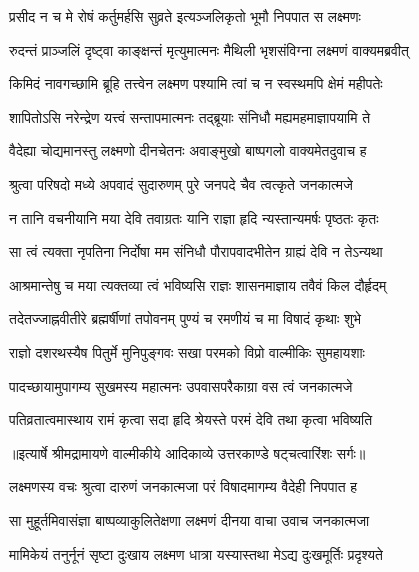 \twolineshloka
{प्रसीद न च मे रोषं कर्तुमर्हसि सुव्रते}
{इत्यञ्जलिकृतो भूमौ निपपात स लक्ष्मणः} %

\twolineshloka
{रुदन्तं प्राञ्जलिं दृष्ट्वा काङ्क्षन्तं मृत्युमात्मनः}
{मैथिली भृशसंविग्ना लक्ष्मणं वाक्यमब्रवीत्} %

\twolineshloka
{किमिदं नावगच्छामि ब्रूहि तत्त्वेन लक्ष्मण}
{पश्यामि त्वां च न स्वस्थमपि क्षेमं महीपतेः} %

\twolineshloka
{शापितोऽसि नरेन्द्रेण यत्त्वं सन्तापमात्मनः}
{तद्ब्रूयाः संनिधौ मह्यमहमाज्ञापयामि ते} %

\twolineshloka
{वैदेह्या चोद्यमानस्तु लक्ष्मणो दीनचेतनः}
{अवाङ्मुखो बाष्पगलो वाक्यमेतदुवाच ह} %

\twolineshloka
{श्रुत्वा परिषदो मध्ये अपवादं सुदारुणम्}
{पुरे जनपदे चैव त्वत्कृते जनकात्मजे} %

\twolineshloka
{न तानि वचनीयानि मया देवि तवाग्रतः}
{यानि राज्ञा हृदि न्यस्तान्यमर्षः पृष्ठतः कृतः} %

\twolineshloka
{सा त्वं त्यक्ता नृपतिना निर्दोषा मम संनिधौ}
{पौरापवादभीतेन ग्राह्यं देवि न तेऽन्यथा} %

\twolineshloka
{आश्रमान्तेषु च मया त्यक्तव्या त्वं भविष्यसि}
{राज्ञः शासनमाज्ञाय तवैवं किल दौर्हृदम्} %

\twolineshloka
{तदेतज्जाह्नवीतीरे ब्रह्मर्षीणां तपोवनम्}
{पुण्यं च रमणीयं च मा विषादं कृथाः शुभे} %

\twolineshloka
{राज्ञो दशरथस्यैष पितुर्मे मुनिपुङ्गवः}
{सखा परमको विप्रो वाल्मीकिः सुमहायशाः} %

\twolineshloka
{पादच्छायामुपागम्य सुखमस्य महात्मनः}
{उपवासपरैकाग्रा वस त्वं जनकात्मजे} %

\twolineshloka
{पतिव्रतात्वमास्थाय रामं कृत्वा सदा हृदि}
{श्रेयस्ते परमं देवि तथा कृत्वा भविष्यति} %


{॥इत्यार्षे श्रीमद्रामायणे वाल्मीकीये आदिकाव्ये उत्तरकाण्डे षट्चत्वारिंशः सर्गः॥}


\twolineshloka
{लक्ष्मणस्य वचः श्रुत्वा दारुणं जनकात्मजा}
{परं विषादमागम्य वैदेही निपपात ह} %

\twolineshloka
{सा मुहूर्तमिवासंज्ञा बाष्पव्याकुलितेक्षणा}
{लक्ष्मणं दीनया वाचा उवाच जनकात्मजा} %

\twolineshloka
{मामिकेयं तनुर्नूनं सृष्टा दुःखाय लक्ष्मण}
{धात्रा यस्यास्तथा मेऽद्य दुःखमूर्तिः प्रदृश्यते} %

